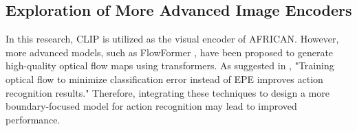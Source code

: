 \subsection{Exploration of More Advanced Image Encoders}
In this research, CLIP is utilized as the visual encoder of AFRICAN. However, more advanced models, such as FlowFormer \parencite{huang2022flowformer}, have been proposed to generate high-quality optical flow maps using transformers. As suggested in \parencite{sevilla2019integration}, "Training optical flow to minimize classification error instead of EPE improves action recognition results." Therefore, integrating these techniques to design a more boundary-focused model for action recognition may lead to improved performance.

